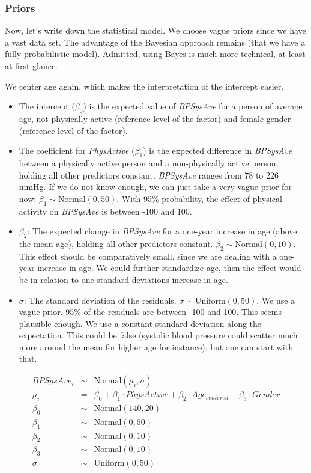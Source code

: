 \documentclass[
]{book}
\begin{document}
\subsubsection{Priors}\label{priors-1}

Now, let's write down the statistical model.
We choose vague priors since we have a vast data set.
The advantage of the Bayesian approach remains (that we have a fully
probabilistic model). Admitted, using Bayes is much more technical, at least
at first glance.

We center age again, which makes the interpretation of the intercept easier.

\begin{itemize}
\item
  The intercept (\(\beta_0\)) is the expected value of \emph{BPSysAve} for a person
  of average age, not physically active (reference level of the factor) and
  female gender (reference level of the factor).
\item
  The coefficient for \emph{PhysActive} (\(\beta_1\)) is the expected difference in
  \emph{BPSysAve} between a physically active person and a non-physically active person,
  holding all other predictors constant. \emph{BPSysAve} ranges from 78 to 226 mmHg.
  If we do not know enough, we can just take a very vague prior for now:
  \(\beta_1 \sim \text{Normal}(0, 50)\). With 95\% probability, the effect of
  physical activity on \emph{BPSysAve} is between -100 and 100.
\item
  \(\beta_2\): The expected change in \emph{BPSysAve} for a one-year increase in age
  (above the mean age), holding all other predictors constant.
  \(\beta_2 \sim \text{Normal}(0, 10)\). This effect should be comparatively small,
  since we are dealing with a one-year increase in age. We could further
  standardize age, then the effect would be in relation to one standard
  deviations increase in age.
\item
  \(\sigma\): The standard deviation of the residuals.
  \(\sigma \sim \text{Uniform}(0, 50)\). We use a vague prior.
  95\% of the residuals are between -100 and 100. This seems plausible enough.
  We use a constant standard deviation along the expectation.
  This could be false (systolic blood pressure could scatter much more around
  the mean for higher age for instance), but one can start with that.
\end{itemize}

\begin{eqnarray*}
BPSysAve_i &\sim& \text{Normal}(\mu_i, \sigma)\\
\mu_i &=& \beta_0 + \beta_1 \cdot PhysActive + \beta_2 \cdot Age_{centered} + \beta_3 \cdot Gender\\
\beta_0 &\sim& \text{Normal}(140, 20)\\
\beta_1 &\sim& \text{Normal}(0, 50)\\
\beta_2 &\sim& \text{Normal}(0, 10)\\
\beta_3 &\sim& \text{Normal}(0, 10)\\
\sigma &\sim& \text{Uniform}(0, 50)
\end{eqnarray*}
\end{document}
